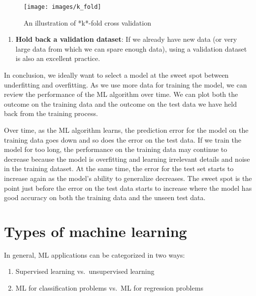\documentclass[
]{book}
\providecommand{\tightlist}{%
  \setlength{\itemsep}{0pt}\setlength{\parskip}{0pt}}
\begin{document}
\begin{figure}
\texttt{[image: images/k\_fold]} \caption{An illustration of *k*-fold cross validation}\label{fig:fig5-4}
\end{figure}

\begin{enumerate}
\def\labelenumi{\arabic{enumi}.}
\setcounter{enumi}{1}
\tightlist
\item
  \textbf{Hold back a validation dataset}: If we already have new data (or very large data from which we can spare enough data), using a validation dataset is also an excellent practice.
\end{enumerate}

In conclusion, we ideally want to select a model at the sweet spot between underfitting and overfitting. As we use more data for training the model, we can review the performance of the ML algorithm over time. We can plot both the outcome on the training data and the outcome on the test data we have held back from the training process.

Over time, as the ML algorithm learns, the prediction error for the model on the training data goes down and so does the error on the test data. If we train the model for too long, the performance on the training data may continue to decrease because the model is overfitting and learning irrelevant details and noise in the training dataset. At the same time, the error for the test set starts to increase again as the model's ability to generalize decreases. The sweet spot is the point just before the error on the test data starts to increase where the model has good accuracy on both the training data and the unseen test data.

\hypertarget{types-of-machine-learning}{%
\section{Types of machine learning}\label{types-of-machine-learning}}

In general, ML applications can be categorized in two ways:

\begin{enumerate}
\def\labelenumi{\arabic{enumi}.}
\tightlist
\item
  Supervised learning vs.~unsupervised learning
\item
  ML for classification problems vs.~ML for regression problems
\end{enumerate}
\end{document}
